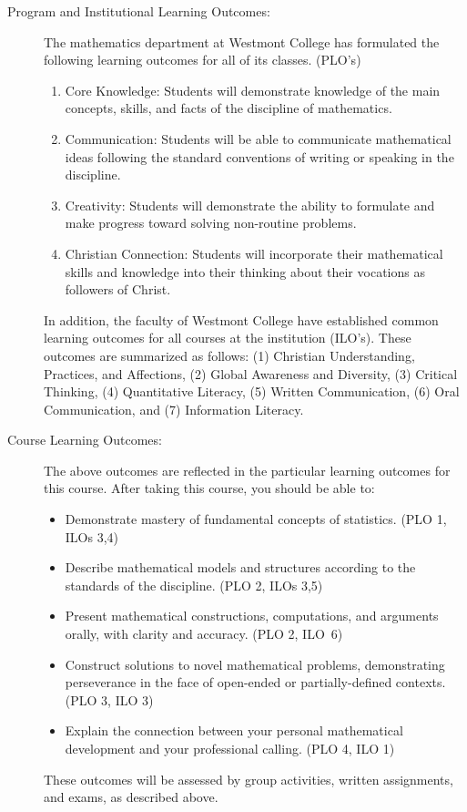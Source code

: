 \documentclass[
  twoside]{article}
\begin{document}
\begin{description}
\item[Program and Institutional Learning Outcomes:] The
         mathematics department at Westmont College has formulated the
         following learning outcomes for all of its classes. (PLO's)
\begin{enumerate}[noitemsep]
\item Core Knowledge: Students will demonstrate knowledge of the
                  main concepts, skills, and facts of the discipline of
                  mathematics.
\item Communication: Students will be able to communicate mathematical ideas
     following the standard conventions of writing or speaking in the
     discipline.
\item Creativity: Students will demonstrate the ability to formulate and make
     progress toward solving non-routine problems.
\item Christian Connection: Students will incorporate their mathematical skills
     and knowledge into their thinking about their vocations as followers of
     Christ.
         \end{enumerate}
         In addition, the faculty of Westmont College have established common
         learning outcomes for all courses at the institution
         (ILO's). These outcomes are summarized as follows:
(1) Christian Understanding, Practices, and Affections,
(2) Global Awareness and Diversity,
(3) Critical Thinking,
(4) Quantitative Literacy,
(5) Written Communication,
(6) Oral Communication, and
(7) Information Literacy.

\item[Course Learning Outcomes:] The above outcomes are reflected in the
     particular learning outcomes for this course.
     After taking this course, you should be able
     to:
    \begin{itemize}[noitemsep]
        \item Demonstrate mastery of fundamental concepts of statistics. (PLO 1, ILOs 3,4)
        \item Describe mathematical models and structures according to the
             standards of the discipline. (PLO 2,
              ILOs 3,5)
        \item Present mathematical constructions, computations, and arguments orally, with
              clarity and accuracy. (PLO 2, ILO~6)
        \item Construct solutions to novel mathematical problems,
               demonstrating perseverance in the face of open-ended or
               partially-defined contexts. (PLO 3, ILO 3)
        \item Explain the connection between your personal mathematical
             development and your professional calling. (PLO 4, ILO
             1)
    \end{itemize}
These outcomes will be assessed by group activities, written assignments, and exams, as described above.

\end{description}
\end{document}
